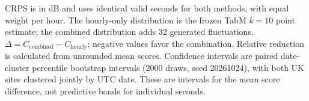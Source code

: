 \begin{table}[t]
\centering
\caption{CRPS of hourly-only and combined second-scale attenuation.}
\label{tab:slow_fast_crps}
\small
\setlength{\tabcolsep}{4pt}
\renewcommand{\arraystretch}{1.1}
\par\smallskip
\begin{minipage}{\linewidth}\footnotesize
CRPS is in dB and uses identical valid seconds for both methods,
with equal weight per hour. The hourly-only distribution is the
frozen TabM $k=10$ point estimate; the combined distribution adds
32 generated fluctuations. $\Delta=C_{\mathrm{combined}}-
C_{\mathrm{hourly}}$; negative values favor the combination.
Relative reduction is calculated from unrounded mean scores.
Confidence intervals are paired date-cluster percentile bootstrap
intervals (2000 draws, seed 20261024), with both UK sites clustered
jointly by UTC date. These are intervals for the mean score
difference, not predictive bands for individual seconds.
\end{minipage}
\end{table}
